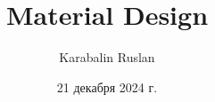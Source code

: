 \documentclass[12pt]{beamer}
\title{Material Design}
\author{Karabalin Ruslan}
\date{21 декабря 2024 г.}
\begin{document}
	
	\begin{frame}
		\titlepage
	\end{frame}
	
\end{document}
